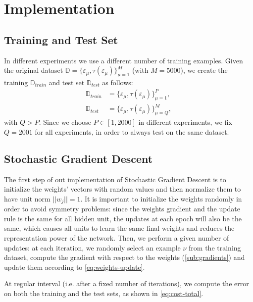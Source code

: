 \section{Implementation}
\label{sec:implementation}

\subsection{Training and Test Set}
In different experiments we use a different number of training examples.
Given the original dataset $\mathbb{D} = \{ \varepsilon_\mu, \tau(\varepsilon_\mu)\}_{\mu=1}^M$ (with $M = 5000$), we create the training $\mathbb{D}_{train}$ and test set $\mathbb{D}_{test}$ as follows:
\begin{equation*}
    \begin{split}
        \mathbb{D}_{train} &= \{ \varepsilon_\mu, \tau(\varepsilon_\mu)\}_{\mu=1}^P, \\
        \mathbb{D}_{test} &= \{ \varepsilon_\mu, \tau(\varepsilon_\mu)\}_{\mu=Q}^M,
    \end{split}
\end{equation*}
with $Q > P$.
Since we choose $P \in [1, 2000]$ in different experiments, we fix $Q = 2001$ for all experiments, in order to always test on the same dataset. 

\subsection{Stochastic Gradient Descent}
The first step of out implementation of Stochastic Gradient Descent is to initialize the weights' vectors with random values and then normalize them to have unit norm $||w_j|| = 1$.
It is important to initialize the weights randomly in order to avoid symmetry problems:
since the weights gradient and the update rule is the same for all hidden unit, the updates at each epoch will also be the same, which causes all units to learn the same final weights and reduces the representation power of the network.
Then, we perform a given number of updates:
at each iteration, we randomly select an example $\nu$ from the training dataset, compute the gradient with respect to the weights (\cref{sub:gradients}) and update them according to \cref{eq:weights-update}.

At regular interval (i.e. after a fixed number of iterations), we compute the error on both the training and the test sets, as shown in \cref{eq:cost-total}.
